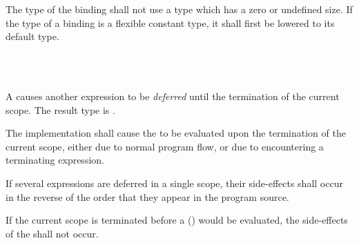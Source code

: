 \specsubsubitem
The type of the binding shall not use a type which has a zero or undefined size.
If the type of a binding is a flexible constant type, it shall first be lowered
to its default type.


\begin{grammar}
 \\
	  \\
\end{grammar}

\specsubsubitem
A  causes another expression to be
\textit{deferred} until the termination of the current scope. The result type
is .

\specsubsubitem
The implementation shall cause the  to be evaluated
upon the termination of the current scope, either due to normal program flow,
or due to encountering a terminating expression.

\specsubsubitem
If several expressions are deferred in a single scope, their side-effects shall
occur in the reverse of the order that they appear in the program source.

\specsubsubitem
If the current scope is terminated before a 
() would be
evaluated, the side-effects of the  shall not occur.


\begin{grammar}
 \\
	 \terminal{;}  \\
	 \terminal{;}  \\
	 \terminal{;}  \\

 \\
	 \terminal{\{}  \terminal{\}} \\

 \\
	\terminal{:}  \\
\end{grammar}

